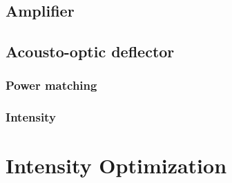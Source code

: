 \section{Amplifier}

\section{Acousto-optic deflector}
\subsection{Power matching}

\subsection{Intensity}


\chapter{Intensity Optimization}
\
